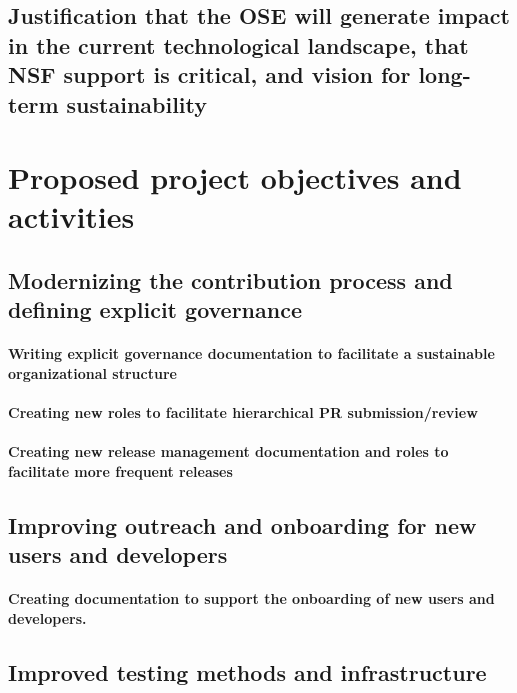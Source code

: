 \documentclass[numbers]{proposalnsf}
\begin{document}
\subsection{Justification that the OSE will generate impact in the current technological landscape, that NSF support is critical, and vision for long-term sustainability}

\section{Proposed project objectives and activities}

\subsection{Modernizing the contribution process and defining explicit governance}


\paragraph{Writing explicit governance documentation to facilitate a sustainable organizational structure}

\paragraph{Creating new roles to facilitate hierarchical PR submission/review}

\paragraph{Creating new release management documentation and roles to facilitate more frequent releases}

\subsection{Improving outreach and onboarding for new users and developers}

\paragraph{Creating documentation to support the onboarding of new users and developers.} \label{sec:doc}

\subsection{Improved testing methods and infrastructure}
\end{document}
